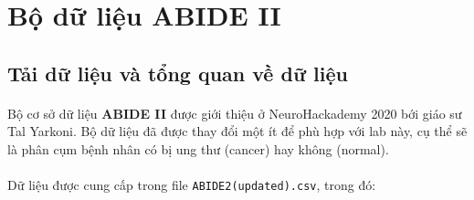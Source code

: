 \section{Bộ dữ liệu ABIDE II}

\subsection{Tải dữ liệu và tổng quan về dữ liệu}
\paragraph{}{Bộ cơ sở dữ liệu \textbf{ABIDE II} \cite{DiMartino2017abideII} được giới thiệu ở NeuroHackademy 2020 bới giáo sư Tal Yarkoni.
Bộ dữ liệu đã được thay đổi một ít để phù hợp với lab này, cụ thể sẽ là phân cụm bệnh nhân có bị ung thư (cancer) hay không (normal).}

\paragraph{}{Dữ liệu được cung cấp trong file \texttt{ABIDE2(updated).csv}, trong đó:}

